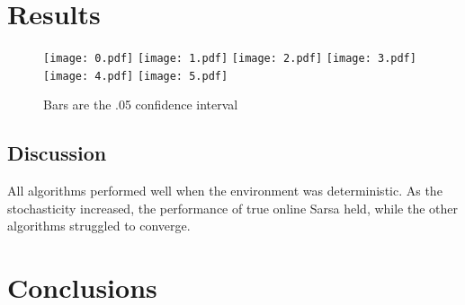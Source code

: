 \documentclass{article}
\begin{document}


	\section{Results}


		\begin{figure}[h]
			\begin{center}
				\texttt{[image: 0.pdf]}
				\texttt{[image: 1.pdf]}
				\texttt{[image: 2.pdf]}
				\texttt{[image: 3.pdf]}
				\texttt{[image: 4.pdf]}
				\texttt{[image: 5.pdf]}
				\caption{Bars are the .05 confidence interval }
			\end{center}
		\end{figure}

	\subsection{Discussion}

    All algorithms performed well when the environment was deterministic. As the stochasticity increased, the performance of true online Sarsa held, while the other algorithms struggled to converge.



	\section{Conclusions}


	\clearpage
\end{document}
